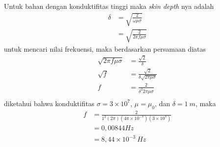 Untuk bahan dengan konduktifitas tinggi maka \textit{skin depth} nya adalah
\begin{align*}
    \delta &= \sqrt{\frac{2}{\omega \mu \sigma}}\\
           &= \sqrt{\frac{2}{2 \pi f \mu \sigma}}
\end{align*}
untuk mencari nilai frekuensi, maka berdasarkan persamaan diatas
\begin{align*}
    \sqrt{2\pi f \mu \sigma} &= \frac{\sqrt{2}}{\delta}\\
    \sqrt{f} &= \frac{\sqrt{2}}{\delta\sqrt{2\pi\mu \sigma}}\\
    f &= \frac{2}{\delta^2 2\pi\mu \sigma}\\
\end{align*}
diketahui bahwa konduktifitas $\sigma=3\times 10^7$, $\mu=\mu_0$, dan $\delta = 1\ \si{m}$, maka
\begin{align*}
    f&=\frac{2}{1^2 (2\pi) (4\pi\times 10^{-7}) (3\times 10^7)}\\
     &=0,00844 Hz\\
     &=8,44 \times 10^{-3}\ \si{Hz}
\end{align*}

